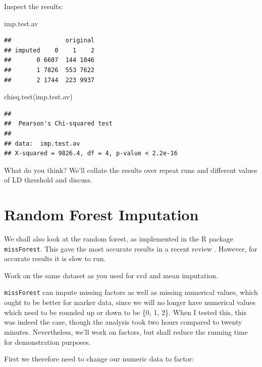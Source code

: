 \documentclass[
]{book}
\newenvironment{Shaded}{\begin{snugshade}}{\end{snugshade}}
\newcommand{\FunctionTok}[1]{\textcolor[rgb]{0.00,0.00,0.00}{#1}}
\newcommand{\NormalTok}[1]{#1}
\begin{document}
Inspect the results:

\begin{Shaded}
\begin{Highlighting}[]
\NormalTok{imp.test.av}
\end{Highlighting}
\end{Shaded}

\begin{verbatim}
##               original
## imputed    0    1    2
##       0 6607  144 1046
##       1 7826  553 7622
##       2 1744  223 9937
\end{verbatim}

\begin{Shaded}
\begin{Highlighting}[]
\FunctionTok{chisq.test}\NormalTok{(imp.test.av)}
\end{Highlighting}
\end{Shaded}

\begin{verbatim}
## 
##  Pearson's Chi-squared test
## 
## data:  imp.test.av
## X-squared = 9826.4, df = 4, p-value < 2.2e-16
\end{verbatim}

What do you think? We'll collate the results over repeat runs and different values of LD threshold and discuss.

\hypertarget{random-forest-imputation}{%
\section{Random Forest Imputation}\label{random-forest-imputation}}

We shall also look at the random forest, as implemented in the R package \texttt{missForest}. This gave the most accurate results in a recent review \citet{Rutkoski_2013}. However, for accurate results it is slow to run.

Work on the same dataset as you used for svd and mean imputation.

\texttt{missForest} can impute missing factors as well as missing numerical values, which ought to be better for marker data, since we will no longer have numerical values which need to be rounded up or down to be \{0, 1, 2\}. When I tested this, this was indeed the case, though the analysis took two hours compared to twenty minutes. Nevertheless, we'll work on factors, but shall reduce the running time for demonstration purposes.

First we therefore need to change our numeric data to factor:
\end{document}
